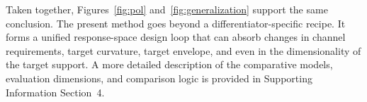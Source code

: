 Taken together, Figures~\ref{fig:pol} and~\ref{fig:generalization} support the same conclusion. The present method goes beyond a differentiator-specific recipe. It forms a unified response-space design loop that can absorb changes in channel requirements, target curvature, target envelope, and even in the dimensionality of the target support. A more detailed description of the comparative models, evaluation dimensions, and comparison logic is provided in Supporting Information Section~4.

\FloatBarrier
